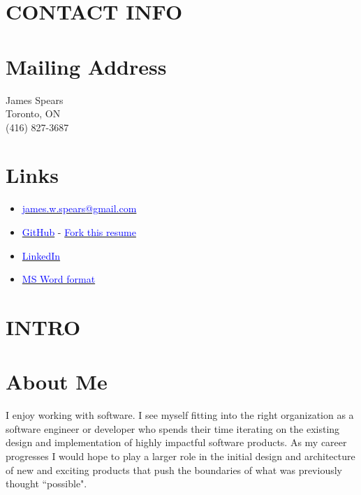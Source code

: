 \documentclass[margin]{res}
\begin{document}
\name{\textcolor{NavyBlue}{James Spears} - \textcolor{black}{\bf Software Developer} }

\begin{resume}

	\section{\textcolor{NavyBlue}{CONTACT INFO}}

	\normalsize{\section{Mailing Address}}
	{James Spears \\ Toronto, ON \\ (416) 827-3687}

	\normalsize{\section{Links}}
	\begin{itemize}
		\item \href{mailto:james.w.spears@gmail.com}{\textcolor{blue}{james.w.spears@gmail.com}}
		\item \href{https://github.com/jameone}{\textcolor{blue}{GitHub}} - \href{https://github.com/jameone/resume}{\textcolor{blue}{Fork this resume}}
		\item \href{https://www.linkedin.com/in/james-spears-50834b8a/}{\textcolor{blue}{LinkedIn}}
		\item \href{https://s3.amazonaws.com/james-spears.com/resume.docx}{\textcolor{blue}{MS Word format}}
	\end{itemize}

	\section{\textcolor{NavyBlue}{INTRO}}

	\normalsize{\section{About Me}}
	I enjoy working with software. I see myself fitting into the right organization
	as a software engineer or developer who spends their time iterating on the existing design
	and implementation of highly impactful software products. As my career progresses I would
	hope to play a larger role in the initial design and architecture of new and exciting products that
	push the boundaries of what was previously thought ``possible".


\end{resume}
\end{document}
